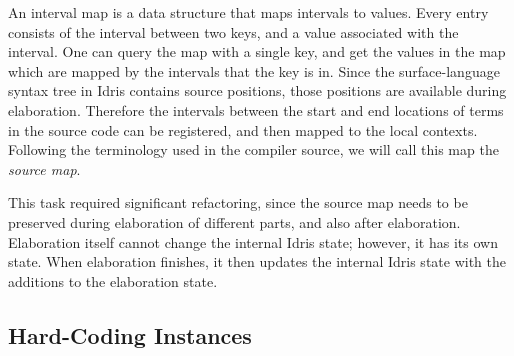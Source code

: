 An interval map is a data structure that maps
intervals to values. Every entry consists of the interval between two keys, and
a value associated with the interval. One can query the map with a single
key, and get the values in the map which are mapped by the intervals that
the key is in.  Since the surface-language syntax tree in Idris contains source
positions, those positions are available during elaboration.  Therefore the
intervals between the start and end locations of terms in the source code can
be registered, and then mapped to the local contexts.  Following the
terminology used in the compiler source, we will call this map the
\emph{source map}.

This task required significant refactoring, since the source map
needs to be preserved during elaboration of different parts, and also after
elaboration. Elaboration itself cannot change the internal Idris state;
however, it has its own state.  When elaboration finishes, it then updates the
internal Idris state with the additions to the elaboration state.

\subsection{Hard-Coding \Editorable{} Instances}

